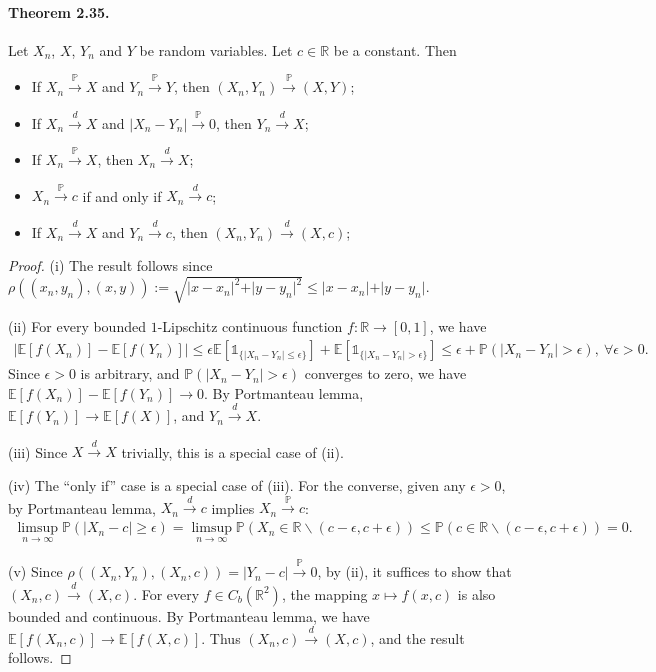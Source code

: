 \documentclass{article}
\numberwithin{equation}{section}
\newcommand{\E}{\mathbb{E}}
\renewcommand{\P}{\mathbb{P}}
\theoremstyle{plain}
\theoremstyle{definition}
\begin{document}
\paragraph{Theorem 2.35.\label{thm:2.35}} Let $X_n$, $X$, $Y_n$ and $Y$ be random variables. Let $c\in\mathbb{R}$ be a constant. Then
\begin{itemize}
	\item[(i)] If $X_n\overset{\P}{\to}X$ and $Y_n\overset{\P}{\to}Y$, then $(X_n,Y_n)\overset{\P}{\to}(X,Y)$;
	\item[(ii)] If $X_n\overset{d}{\to}X$ and $\vert X_n-Y_n\vert\overset{\P}{\to}0$, then $Y_n\overset{d}{\to}X$;
	\item[(iii)] If $X_n\overset{\P}{\to}X$, then $X_n\overset{d}{\to}X$;
	\item[(iv)] $X_n\overset{\P}{\to}c$ if and only if $X_n\overset{d}{\to}c$;
	\item[(v)] If $X_n\overset{d}{\to}X$ and $Y_n\overset{d}{\to}c$, then $(X_n,Y_n)\overset{d}{\to}(X,c)$;
\end{itemize}
\begin{proof}
(i) The result follows since $\rho((x_n,y_n),(x,y)):=\sqrt{\vert x-x_n\vert^2 + \vert y-y_n\vert^2}\leq\vert x-x_n\vert + \vert y-y_n\vert$.

(ii) For every bounded $1$-Lipschitz continuous function $f:\mathbb{R}\to[0,1]$, we have
\begin{align*} \left\vert\E[f(X_n)]-\E[f(Y_n)]\right\vert\leq\epsilon\E[\mathds{1}_{\{\vert X_n-Y_n\vert\leq\epsilon\}}] + \E[\mathds{1}_{\{\vert X_n-Y_n\vert>\epsilon\}}]\leq\epsilon+\P(\vert X_n-Y_n\vert>\epsilon),\ \forall\epsilon>0.
\end{align*}
Since $\epsilon>0$ is arbitrary, and $\P(\vert X_n-Y_n\vert>\epsilon)$ converges to zero, we have $\E[f(X_n)]-\E[f(Y_n)]\to 0$. By Portmanteau lemma, $\E[f(Y_n)]\to\E[f(X)]$, and $Y_n\overset{d}{\to} X$.

(iii) Since $X\overset{d}{\to}X$ trivially, this is a special case of (ii).

(iv) The ``only if'' case is a special case of (iii). For the converse, given any $\epsilon>0$, by Portmanteau lemma, $X_n\overset{d}{\to}c$ implies $X_n\overset{\P}{\to}c$:
\begin{align*}
	\limsup_{n\to\infty}\P(\vert X_n - c\vert\geq\epsilon)=\limsup_{n\to\infty}\P(X_n\in\mathbb{R}\backslash(c-\epsilon,c+\epsilon))\leq\P(c\in\mathbb{R}\backslash(c-\epsilon,c+\epsilon)) = 0.
\end{align*}

(v) Since $\rho((X_n,Y_n),(X_n,c))=\vert Y_n - c\vert\overset{\P}{\to} 0$, by (ii), it suffices to show that $(X_n,c)\overset{d}{\to}(X,c)$. For every $f\in C_b(\mathbb{R}^2)$, the mapping $x\mapsto f(x,c)$ is also bounded and continuous. By Portmanteau lemma, we have $\E[f(X_n,c)]\to\E[f(X,c)]$. Thus $(X_n,c)\overset{d}{\to}(X,c)$, and the result follows.
\end{proof}
\end{document}
